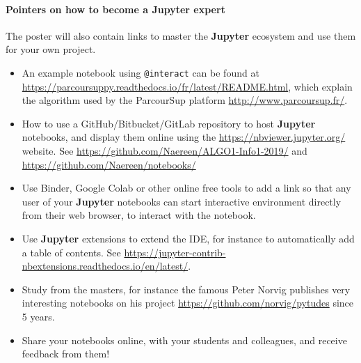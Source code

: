 \documentclass[runningheads]{llncs}
\newcommand{\Jupyter}{\textbf{Jupyter}}
\begin{document}




\paragraph{Pointers on how to become a \Jupyter{} expert}

The poster will also contain links to master the \Jupyter{} ecosystem and use them for your own project.

\begin{itemize}
    \item An example notebook using \texttt{@interact} can be found at \url{https://parcoursuppy.readthedocs.io/fr/latest/README.html}, which explain the algorithm used by the ParcourSup platform \url{http://www.parcoursup.fr/}.
    \item How to use a GitHub/Bitbucket/GitLab repository to host \Jupyter{} notebooks, and display them online using the \url{https://nbviewer.jupyter.org/} website.
    See \url{https://github.com/Naereen/ALGO1-Info1-2019/} and \url{https://github.com/Naereen/notebooks/}
    \item Use Binder, Google Colab or other online free tools to add a link so that any user of your \Jupyter{} notebooks can start interactive environment directly from their web browser, to interact with the notebook.
    \item Use \Jupyter{} extensions to extend the IDE, for instance to automatically add a table of contents. See \url{https://jupyter-contrib-nbextensions.readthedocs.io/en/latest/}.
    \item Study from the masters, for instance the famous Peter Norvig publishes very interesting notebooks on his project \url{https://github.com/norvig/pytudes} since 5 years.
    \item Share your notebooks online, with your students and colleagues, and receive feedback from them!
\end{itemize}
\end{document}
